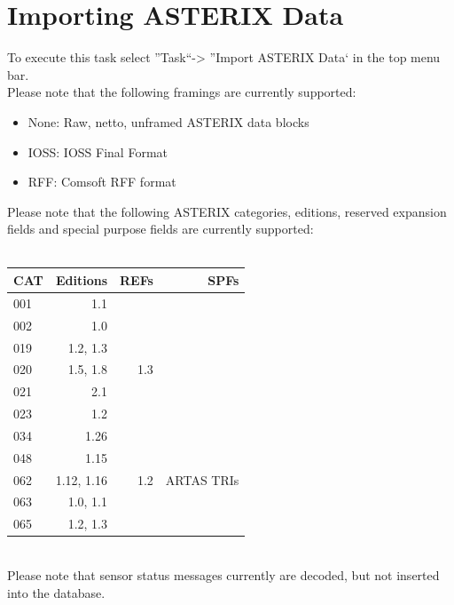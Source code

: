 \section{Importing ASTERIX Data}
\label{sec:asterix_import}

To execute this task select ''Task``->  ''Import ASTERIX Data` in the top menu bar. \\

Please note that the following framings are currently supported:
\begin{itemize}  
\item None: Raw, netto, unframed ASTERIX data blocks
\item IOSS: IOSS Final Format
\item RFF: Comsoft RFF format
\end{itemize}

Please note that the following ASTERIX categories, editions, reserved expansion fields and special purpose fields are currently supported: \\\\

\begin{tabular}{ | l | r | r | r |}
\hline
  CAT & Editions & REFs & SPFs  \\ \hline
  001 & 1.1 &  &  \\ \hline
  002 & 1.0 &  &  \\ \hline
  019 & 1.2, 1.3 & & \\ \hline
  020 & 1.5, 1.8 & 1.3 & \\ \hline
  021 & 2.1 & & \\ \hline
  023 & 1.2 & & \\ \hline
  034 & 1.26 & & \\ \hline
  048 & 1.15 & & \\ \hline
  062 & 1.12, 1.16 & 1.2 & ARTAS TRIs \\ \hline
  063 & 1.0, 1.1 & & \\ \hline
  065 & 1.2, 1.3 & & \\ \hline
\end{tabular} \\

Please note that sensor status messages currently are decoded, but not inserted into the database.

